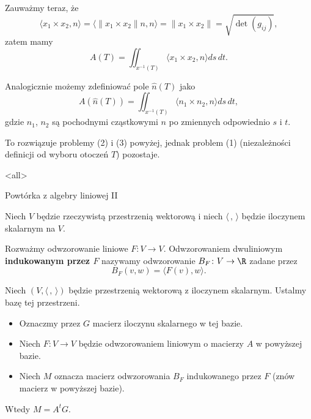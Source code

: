 \begin{frame}[<+->]

Zauważmy teraz, że \[\langle x_1\times x_2, n\rangle=\langle \|x_1\times x_2\|n,n \rangle= \|x_1\times x_2\|=\sqrt{\det (g_{ij})},\]\pause zatem mamy
\[A(T)=\iint_{x^{-1}(T)}\langle x_1\times x_2, n\rangle ds\,dt.\]

\pause Analogicznie możemy zdefiniować pole $\widehat{n}(T)$ jako 
\[A(\widehat{n}(T))=\iint_{x^{-1}(T)}\langle n_1\times n_2, n\rangle ds\,dt,\]
gdzie $n_1$, $n_2$ są pochodnymi cząstkowymi $n$ po zmiennych odpowiednio $s$ i $t$.

\pause To rozwiązuje problemy (2) i (3) powyżej, jednak problem (1) (niezależności definicji od wyboru otoczeń $T$) pozostaje. 

\end{frame}
\mode<all>{}
\begin{frame}{Powtórka z algebry liniowej II}

Niech $V$ będzie rzeczywistą przestrzenią wektorową i niech $\langle\,,\,\rangle$ będzie iloczynem skalarnym na $V$. 
\pause \begin{definicja}
Rozważmy odwzorowanie liniowe $F\colon V\to V$. Odwzorowaniem dwuliniowym \textbf{indukowanym przez $F$} nazywamy odwzorowanie $B_F\colon V\to \R$ zadane przez \[B_F(v,w)=\langle F(v),w\rangle.\]
\end{definicja}

\end{frame}
\begin{frame}

\begin{lemat}
Niech $(V,\langle\,,\,\rangle)$ będzie przestrzenią wektorową z iloczynem skalarnym. Ustalmy bazę tej przestrzeni.
\begin{itemize}
\pause \item Oznaczmy przez $G$ macierz iloczynu skalarnego w tej bazie.
\pause \item Niech $F\colon V\to V$ będzie odwzorowaniem liniowym o macierzy $A$ w powyższej bazie.
\pause \item Niech $M$ oznacza macierz odwzorowania $B_F$ indukowanego przez $F$ (znów macierz w powyższej bazie).
\end{itemize}
\pause Wtedy $M=A^tG$.

\end{lemat}
\end{frame}
